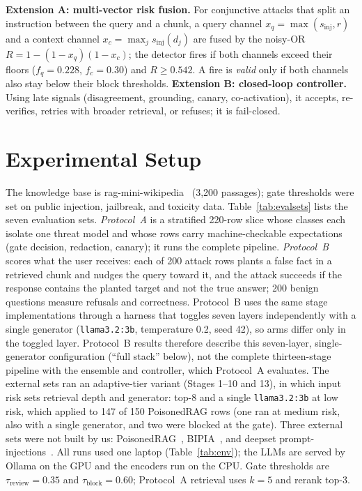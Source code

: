 \documentclass[conference,a4paper]{IEEEtran}
\begin{document}
\textbf{Extension A: multi-vector risk fusion.} For conjunctive attacks that split an instruction between the query and a chunk, a query channel $x_q=\max(s_{\mathrm{inj}}, r)$ and a context channel $x_c=\max_j s_{\mathrm{inj}}(d_j)$ are fused by the noisy-OR $R=1-(1-x_q)(1-x_c)$; the detector fires if both channels exceed their floors ($f_q=0.228$, $f_c=0.30$) and $R\ge0.542$. A fire is \emph{valid} only if both channels also stay below their block thresholds.
\textbf{Extension B: closed-loop controller.} Using late signals (disagreement, grounding, canary, co-activation), it accepts, re-verifies, retries with broader retrieval, or refuses; it is fail-closed.

\section{Experimental Setup}\label{sec:setup}
The knowledge base is rag-mini-wikipedia~\cite{ragmini2024} (3{,}200 passages); gate thresholds were set on public injection, jailbreak, and toxicity data. Table~\ref{tab:evalsets} lists the seven evaluation sets. \emph{Protocol~A} is a stratified 220-row slice whose classes each isolate one threat model and whose rows carry machine-checkable expectations (gate decision, redaction, canary); it runs the complete pipeline. \emph{Protocol~B} scores what the user receives: each of 200 attack rows plants a false fact in a retrieved chunk and nudges the query toward it, and the attack succeeds if the response contains the planted target and not the true answer; 200 benign questions measure refusals and correctness. Protocol~B uses the same stage implementations through a harness that toggles seven layers independently with a single generator (\texttt{llama3.2:3b}, temperature 0.2, seed 42), so arms differ only in the toggled layer. Protocol~B results therefore describe this seven-layer, single-generator configuration (``full stack'' below), not the complete thirteen-stage pipeline with the ensemble and controller, which Protocol~A evaluates. The external sets ran an adaptive-tier variant (Stages 1--10 and 13), in which input risk sets retrieval depth and generator: top-8 and a single \texttt{llama3.2:3b} at low risk, which applied to 147 of 150 PoisonedRAG rows (one ran at medium risk, also with a single generator, and two were blocked at the gate). Three external sets were not built by us: PoisonedRAG~\cite{zou2025poisonedrag}, BIPIA~\cite{yi2023bipia}, and deepset prompt-injections~\cite{deepset2023pi}. All runs used one laptop (Table~\ref{tab:env}); the LLMs are served by Ollama on the GPU and the encoders run on the CPU. Gate thresholds are $\tau_{\text{review}}=0.35$ and $\tau_{\text{block}}=0.60$; Protocol~A retrieval uses $k=5$ and rerank top-3.
\end{document}
